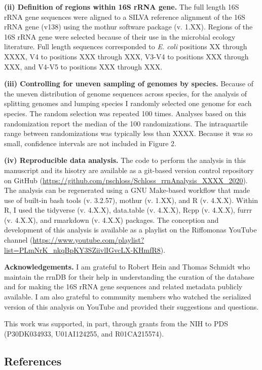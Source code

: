 \documentclass[
]{article}
\begin{document}
\textbf{(ii) Definition of regions within 16S rRNA gene.} The full
length 16S rRNA gene sequences were aligned to a SILVA reference
alignment of the 16S rRNA gene (v138) using the mothur software package
(v. 1.XX). Regions of the 16S rRNA gene were selected because of their
use in the microbial ecology literature. Full length sequences
corresponded to \emph{E. coli} positions XX through XXXX, V4 to
positions XXX through XXX, V3-V4 to positions XXX through XXX, and V4-V5
to positions XXX through XXX.

\textbf{(iii) Controlling for uneven sampling of genomes by species.}
Because of the uneven distribution of genome sequences across species,
for the analysis of splitting genomes and lumping species I randomly
selected one genome for each species. The random selection was repeated
100 times. Analyses based on this randomization report the median of the
100 randomizations. The intraquartile range between randomizations was
typically less than XXXX. Because it was so small, confidence intervals
are not included in Figure 2.

\textbf{(iv) Reproducible data analysis.} The code to perform the
analysis in this manuscript and its hisotry are available as a git-based
version control repository on GitHub
(\url{https://github.com/pschloss/Schloss_rrnAnalysis_XXXX_2020}). The
analysis can be regenerated using a GNU Make-based workflow that made
use of built-in bash tools (v. 3.2.57), mothur (v. 1.XX), and R (v.
4.X.X). Within R, I used the tidyverse (v. 4.X.X), data.table (v.
4.X.X), Rcpp (v. 4.X.X), furrr (v. 4.X.X), and rmarkdown (v. 4.X.X)
packages. The conception and development of this analysis is available
as a playlist on the Riffomonas YouTube channel
(\url{https://www.youtube.com/playlist?list=PLmNrK_nkqBpKY3SZiivlIGvcLX-KHmfR8}).

\textbf{Acknowledgements.} I am grateful to Robert Hein and Thomas
Schmidt who maintain the rrnDB for their help in understanding the
curation of the database and for making the 16S rRNA gene sequences and
related metadata publicly available. I am also grateful to community
members who watched the serialized version of this analysis on YouTube
and provided their suggestions and questions.

This work was supported, in part, through grants from the NIH to PDS
(P30DK034933, U01AI124255, and R01CA215574).

\newpage

\hypertarget{references}{%
\subsection{References}\label{references}}
\end{document}
